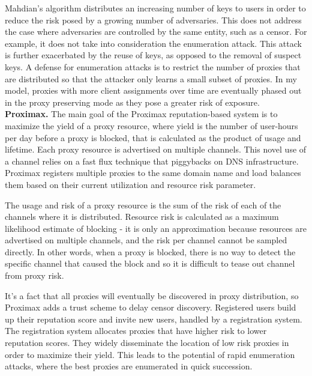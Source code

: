 Mahdian's algorithm distributes an increasing number of keys to users in order to reduce the risk posed by a growing number of adversaries. This does not address the case where adversaries are controlled by the same entity, such as a censor. For example, it does not take into consideration the enumeration attack. This attack is further exacerbated by the reuse of keys, as opposed to the removal of suspect keys. A defense for enumeration attacks is to restrict the number of proxies that are distributed so that the attacker only learns a small subset of proxies. In my model, proxies with more client assignments over time are eventually phased out in the proxy preserving mode as they pose a greater risk of exposure.\\

\textbf{Proximax.} The main goal of the Proximax \cite{mccoy2011proximax} reputation-based system is to maximize the yield of a proxy resource, where yield is the number of user-hours per day before a proxy is blocked, that is calculated as the product of usage and lifetime. Each proxy resource is advertised on multiple channels. This novel use of a channel relies on a fast flux technique that piggybacks on DNS infrastructure. Proximax registers multiple proxies to the same domain name and load balances them based on their current utilization and resource risk parameter. 

The usage and risk of a proxy resource is the sum of the risk of each of the channels where it is distributed. Resource risk is calculated as a maximum likelihood estimate of blocking - it is only an approximation because resources are advertised on multiple channels, and the risk per channel cannot be sampled directly. In other words, when a proxy is blocked, there is no way to detect the specific channel that caused the block and so it is difficult to tease out channel from proxy risk. 


It's a fact that all proxies will eventually be discovered in proxy distribution, so Proximax adds a trust scheme to delay censor discovery. Registered users build up their reputation score and invite new users, handled by a registration system. The registration system allocates proxies that have higher risk to lower reputation scores. They widely disseminate the location of low risk proxies in order to maximize their yield. This leads to the potential of rapid enumeration attacks, where the best proxies are enumerated in quick succession. 

